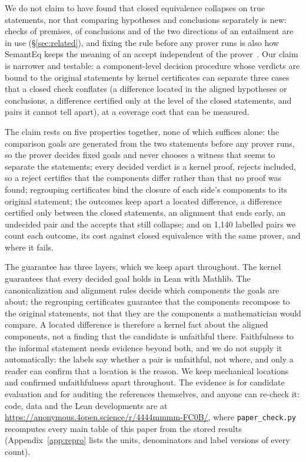 \documentclass[10pt]{article}
\theoremstyle{definition}
\begin{document}
We do not claim to have found that closed equivalence collapses on true statements, nor that
comparing hypotheses and conclusions separately is new: checks of premises, of conclusions and
of the two directions of an entailment are in use (\S\ref{sec:related}), and fixing the rule
before any prover runs is also how SemantEq keeps the meaning of an accept independent of the
prover~\cite{semanteq}. Our claim is narrower
and testable: a component-level decision procedure whose verdicts are bound to the original
statements by kernel certificates can separate three cases that a closed check conflates (a
difference located in the aligned hypotheses or conclusions, a difference certified only at the
level of the closed statements, and pairs it cannot tell apart), at a coverage cost that can be
measured.

The claim rests on five properties together, none of which suffices alone: the
comparison goals are generated from the two statements before any prover runs, so the prover
decides fixed goals and never chooses a witness that seems to separate the statements; every
decided verdict is a kernel proof, rejects included, so a reject certifies that the components
differ rather than that no proof was found; regrouping certificates bind the closure of each side's
components to its original statement; the outcomes keep apart a located difference, a
difference certified only between the closed statements, an alignment that ends early, an
undecided pair and the accepts that still collapse; and on 1,140 labelled pairs we count each
outcome, its cost against closed equivalence with the same prover, and where it fails.

The guarantee has three
layers, which we keep apart throughout. The kernel guarantees that every decided goal holds in
Lean with Mathlib. The canonicalization and alignment rules decide which components the goals
are about; the regrouping certificates guarantee that the components recompose to the original
statements, not that they are the components a mathematician would compare. A located
difference is therefore a kernel fact about the aligned components, not a finding that the
candidate is unfaithful there. Faithfulness to the informal statement needs evidence beyond
both, and we do not supply it automatically: the labels say whether a pair is unfaithful, not
where, and only a reader can confirm that a location is the reason. We keep mechanical
locations and confirmed unfaithfulness apart throughout. The evidence is for candidate
evaluation and for auditing the references themselves, and anyone can re-check it: code, data
and the Lean developments are at \url{https://anonymous.4open.science/r/4444mmmm-FC0B/}, where
\texttt{paper\_check.py} recomputes every main table of this paper from the stored results
(Appendix~\ref{app:repro} lists the units, denominators and label versions of every count).
\end{document}
